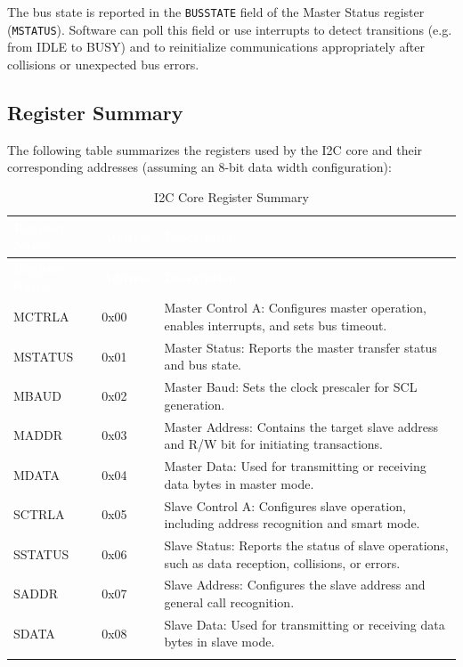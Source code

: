 The bus state is reported in the \texttt{BUSSTATE} field of the Master Status register (\texttt{MSTATUS}). Software
can poll this field or use interrupts to detect transitions (e.g. from IDLE to BUSY) and to reinitialize communications
appropriately after collisions or unexpected bus errors.

\bigskip

\subsection{Register Summary}

The following table summarizes the registers used by the I2C core and their corresponding addresses (assuming an 8-bit data
width configuration):

\renewcommand*{\arraystretch}{1.4}
\begingroup
\small
{}
\begin{longtable}[H]{
    | p{}
    | p{}
    | p{} |
  }
  \hline
  \rowcolor{black}
  \textcolor{white}{\textbf{Register Name}} &
  \textcolor{white}{\textbf{Address}} &
  \textcolor{white}{\textbf{Description}} \\ \hline \hline
  \endfirsthead
  
  \rowcolor{black}
  \textcolor{white}{\textbf{Register Name}} &
  \textcolor{white}{\textbf{Address}} &
  \textcolor{white}{\textbf{Description}} \\ \hline \hline
  \endhead
  
  \hline
  \endfoot
  
  MCTRLA  & 0x00 & Master Control A: Configures master operation, enables interrupts, and sets bus timeout. \\ \hline
  MSTATUS & 0x01 & Master Status: Reports the master transfer status and bus state. \\ \hline
  MBAUD   & 0x02 & Master Baud: Sets the clock prescaler for SCL generation. \\ \hline
  MADDR   & 0x03 & Master Address: Contains the target slave address and R/W bit for initiating transactions. \\ \hline
  MDATA   & 0x04 & Master Data: Used for transmitting or receiving data bytes in master mode. \\ \hline
  SCTRLA  & 0x05 & Slave Control A: Configures slave operation, including address recognition and smart mode. \\ \hline
  SSTATUS & 0x06 & Slave Status: Reports the status of slave operations, such as data reception, collisions, or errors. \\ \hline
  SADDR   & 0x07 & Slave Address: Configures the slave address and general call recognition. \\ \hline
  SDATA   & 0x08 & Slave Data: Used for transmitting or receiving data bytes in slave mode. \\ \hline
  \caption{I2C Core Register Summary}
  \label{table:i2c_register_summary}
\end{longtable}
\endgroup

